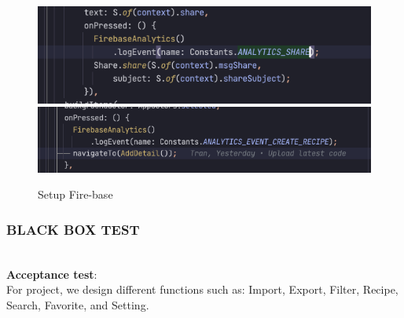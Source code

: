 \documentclass{article}
\begin{document}
\begin{figure}[h!]
    \centering
    \includegraphics[scale=0.45]{Images/firebaselog-setup1.png}
    \includegraphics[scale=0.45]{Images/firebaselog-setup2.png}
    \caption{Setup Fire-base}
    \label{fig:cookingbook}
\end{figure}

\newpage

\subsubsection{BLACK BOX TEST} \\
\textbf{Acceptance test}: \\
    For project, we design different functions such as: Import, Export, Filter, Recipe, Search, Favorite, and Setting. \\
\end{document}
